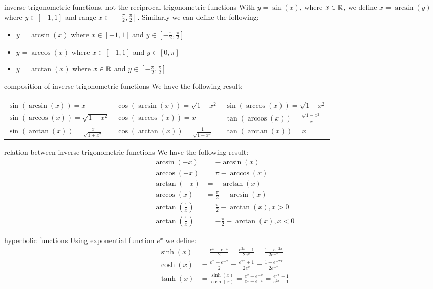 \documentclass{article}
\begin{document}
\begin{myleftlinebox}
	inverse trigonometric functions, not the reciprocal trigonometric functions
	\tcblower
	With $y=\sin(x)$, where $x\in \mathbb{R}$, we define $x=\arcsin(y)$ where $y\in[-1,1]$ and range $x\in [-\frac{\pi}{2},\frac{\pi}{2}]$. Similarly we can define the following:
	\begin{itemize}
		\item $y=\arcsin(x)$ where $x\in[-1,1]$ and $y\in [-\frac{\pi}{2},\frac{\pi}{2}]$
		\item $y=\arccos(x)$ where $x\in[-1,1]$ and $y\in [0,\pi]$
		\item $y=\arctan(x)$ where $x\in\mathbb{R}$ and $y\in [-\frac{\pi}{2},\frac{\pi}{2}]$
	\end{itemize}
\end{myleftlinebox}

\begin{myleftlinebox}
	composition of inverse trigonometric functions
	\tcblower
	We have the following result:
	\begin{center}
		\begin{tabular}{lll}
			$\sin(\arcsin(x))=x$ & $\cos(\arcsin(x))=\sqrt{1-x^2}$ & $\sin(\arccos(x))=\sqrt{1-x^2}$\\
			$\sin(\arccos(x))=\sqrt{1-x^2}$ & $\cos(\arccos(x))=x$ & $\tan(\arccos(x))=\frac{\sqrt{1-x^2}}{x}$\\
			$\sin(\arctan(x))=\frac{x}{\sqrt{1+x^2}}$ & $\cos(\arctan(x))=\frac{1}{\sqrt{1+x^2}}$ & $\tan(\arctan(x))=x$
		\end{tabular}
	\end{center}
\end{myleftlinebox}

\begin{myleftlinebox}
	relation between inverse trigonometric functions
	\tcblower
	We have the following result:
	\begin{align*}
		\arcsin(-x) &= -\arcsin(x)\\
		\arccos(-x) &= \pi-\arccos(x)\\
		\arctan(-x) &= -\arctan(x)\\
		\arccos(x) &= \frac{\pi}{2}-\arcsin(x)\\
		\arctan(\frac{1}{x}) &= \frac{\pi}{2}- \arctan(x), x>0\\
		\arctan(\frac{1}{x}) &= -\frac{\pi}{2}- \arctan(x), x<0
	\end{align*}
\end{myleftlinebox}

\begin{myleftlinebox}
	hyperbolic functions
	\tcblower
	Using exponential function $e^x$ we define:
	\begin{align*}
		\sinh(x) &= \frac{e^x-e^{-x}}{2} = \frac{e^{2x}-1}{2e^x} = \frac{1-e^{-2x}}{2e^{-x}}\\
		\cosh(x) &= \frac{e^x+e^{-x}}{2} = \frac{e^{2x}+1}{2e^x} = \frac{1+e^{-2x}}{2e^{-x}}\\ 
		\tanh(x) &= \frac{\sinh(x)}{\cosh(x)} = \frac{e^x-e^{-x}}{e^x+e^{-x}} = \frac{e^{2x}-1}{e^{2x}+1}
	\end{align*}
\end{myleftlinebox}
\end{document}
